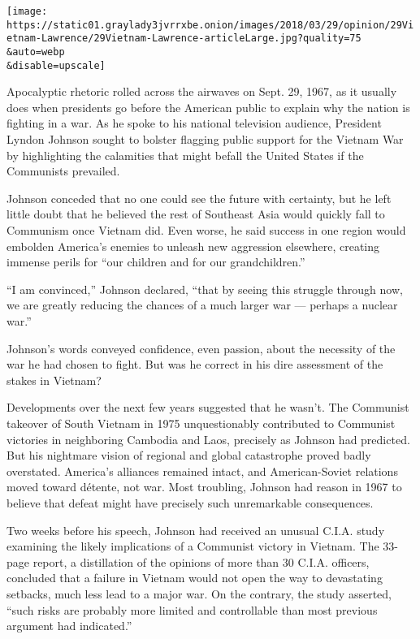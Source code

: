 \texttt{[image: https://static01.graylady3jvrrxbe.onion/images/2018/03/29/opinion/29Vietnam-Lawrence/29Vietnam-Lawrence-articleLarge.jpg?quality=75\\\&auto=webp\\\&disable=upscale]}

Apocalyptic rhetoric rolled across the airwaves on Sept. 29, 1967, as it
usually does when presidents go before the American public to explain
why the nation is fighting in a war. As he spoke to his national
television audience, President Lyndon Johnson sought to bolster flagging
public support for the Vietnam War by highlighting the calamities that
might befall the United States if the Communists prevailed.

Johnson conceded that no one could see the future with certainty, but he
left little doubt that he believed the rest of Southeast Asia would
quickly fall to Communism once Vietnam did. Even worse, he said success
in one region would embolden America's enemies to unleash new aggression
elsewhere, creating immense perils for ``our children and for our
grandchildren.''

``I am convinced,'' Johnson declared, ``that by seeing this struggle
through now, we are greatly reducing the chances of a much larger war
--- perhaps a nuclear war.''

Johnson's words conveyed confidence, even passion, about the necessity
of the war he had chosen to fight. But was he correct in his dire
assessment of the stakes in Vietnam?

Developments over the next few years suggested that he wasn't. The
Communist takeover of South Vietnam in 1975 unquestionably contributed
to Communist victories in neighboring Cambodia and Laos, precisely as
Johnson had predicted. But his nightmare vision of regional and global
catastrophe proved badly overstated. America's alliances remained
intact, and American-Soviet relations moved toward détente, not war.
Most troubling, Johnson had reason in 1967 to believe that defeat might
have precisely such unremarkable consequences.

Two weeks before his speech, Johnson had received an unusual C.I.A.
study examining the likely implications of a Communist victory in
Vietnam. The 33-page report, a distillation of the opinions of more than
30 C.I.A. officers, concluded that a failure in Vietnam would not open
the way to devastating setbacks, much less lead to a major war. On the
contrary, the study asserted, ``such risks are probably more limited and
controllable than most previous argument had indicated.''

